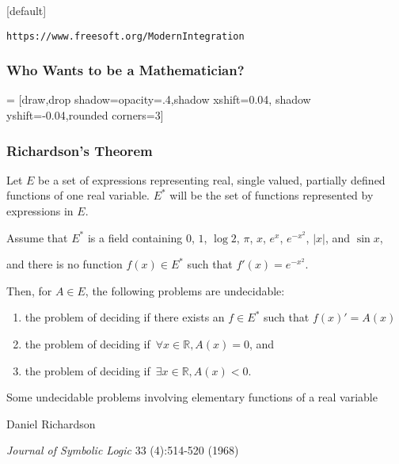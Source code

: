 \documentclass[aspectratio=169,dvipsnames]{beamer}
\begin{document}

[default]

\begin{frame}
\titlepage
\begin{block}{}
\centerline{\tt https://www.freesoft.org/ModernIntegration}
\end{block}
\end{frame}

\begin{frame}
\frametitle{Who Wants to be a Mathematician?}
\def\QuestionFont{\Huge\bf}
\def\AnswerFont{}
\def\huge{}
\def\LARGE{}
\end{frame}

 = [draw,drop shadow={opacity=.4,shadow xshift=0.04, shadow yshift=-0.04},rounded corners=3]

\begin{frame}
\frametitle{Richardson's Theorem}
\begin{theorem}[Richardson]
Let $E$ be a set of expressions representing real,
single valued, partially defined functions of one
real variable.  $E^*$ will be the set of functions
represented by expressions in $E$.

\bigskip

Assume that $E^*$ is a field
containing $0$, $1$, $\log 2$, $\pi$, $x$, $e^x$, $e^{-x^2}$, $|x|$, and $\sin x$,

and there is no function $f(x) \in E^*$ such that $f'(x) = e^{-x^2}$.

\bigskip

Then, for $A \in E$, the following problems are undecidable:

\begin{enumerate}
\item the problem of deciding if there exists an $f \in E^*$ such that $f(x)' = A(x)$
\item the problem of deciding if $\,\forall x \in \mathbb{R}, A(x) = 0$, and
\item the problem of deciding if $\,\exists x \in \mathbb{R}, A(x) < 0$.
\end{enumerate}

\end{theorem}

Some undecidable problems involving elementary functions of a real variable

Daniel Richardson

{\it Journal of Symbolic Logic} 33 (4):514-520 (1968)

\end{frame}
\end{document}
